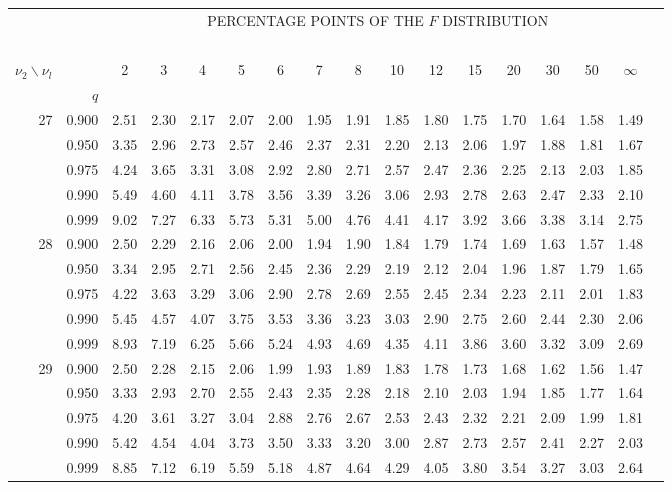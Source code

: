 {\begin{center}
\begin{tabular}{rrr@{\,}r@{\,}r@{\,}r@{\,}r@{\,}r@{\,}r@{\,}r
                   @{\,}r@{\,}r@{\,}r@{\,}r@{\,}r@{\,}r@{\,}r}
&&\multicolumn{14}{c}{PERCENTAGE POINTS OF THE $F$ DISTRIBUTION}\\
\ \\
$\nu_2\backslash\nu_l$ & & 
\multicolumn{1}{c}{2} &\multicolumn{1}{c}{3} &
\multicolumn{1}{c}{4} &\multicolumn{1}{c}{5} &
\multicolumn{1}{c}{6} &\multicolumn{1}{c}{7} &
\multicolumn{1}{c}{8} &\multicolumn{1}{c}{10}&
\multicolumn{1}{c}{12}&\multicolumn{1}{c}{15}&
\multicolumn{1}{c}{20}&\multicolumn{1}{c}{30}&
\multicolumn{1}{c}{50}&\multicolumn{1}{c}{$\infty$}\\
& $q$ \\
27&0.900&2.51&2.30&2.17&2.07&2.00&1.95&1.91&1.85&1.80&1.75&1.70&1.64&1.58&1.49\\
  &0.950&3.35&2.96&2.73&2.57&2.46&2.37&2.31&2.20&2.13&2.06&1.97&1.88&1.81&1.67\\
  &0.975&4.24&3.65&3.31&3.08&2.92&2.80&2.71&2.57&2.47&2.36&2.25&2.13&2.03&1.85\\
  &0.990&5.49&4.60&4.11&3.78&3.56&3.39&3.26&3.06&2.93&2.78&2.63&2.47&2.33&2.10\\
  &0.999&9.02&7.27&6.33&5.73&5.31&5.00&4.76&4.41&4.17&3.92&3.66&3.38&3.14&2.75\\
28&0.900&2.50&2.29&2.16&2.06&2.00&1.94&1.90&1.84&1.79&1.74&1.69&1.63&1.57&1.48\\
  &0.950&3.34&2.95&2.71&2.56&2.45&2.36&2.29&2.19&2.12&2.04&1.96&1.87&1.79&1.65\\
  &0.975&4.22&3.63&3.29&3.06&2.90&2.78&2.69&2.55&2.45&2.34&2.23&2.11&2.01&1.83\\
  &0.990&5.45&4.57&4.07&3.75&3.53&3.36&3.23&3.03&2.90&2.75&2.60&2.44&2.30&2.06\\
  &0.999&8.93&7.19&6.25&5.66&5.24&4.93&4.69&4.35&4.11&3.86&3.60&3.32&3.09&2.69\\
29&0.900&2.50&2.28&2.15&2.06&1.99&1.93&1.89&1.83&1.78&1.73&1.68&1.62&1.56&1.47\\
  &0.950&3.33&2.93&2.70&2.55&2.43&2.35&2.28&2.18&2.10&2.03&1.94&1.85&1.77&1.64\\
  &0.975&4.20&3.61&3.27&3.04&2.88&2.76&2.67&2.53&2.43&2.32&2.21&2.09&1.99&1.81\\
  &0.990&5.42&4.54&4.04&3.73&3.50&3.33&3.20&3.00&2.87&2.73&2.57&2.41&2.27&2.03\\
  &0.999&8.85&7.12&6.19&5.59&5.18&4.87&4.64&4.29&4.05&3.80&3.54&3.27&3.03&2.64\\

\end{tabular}
\end{center}}
